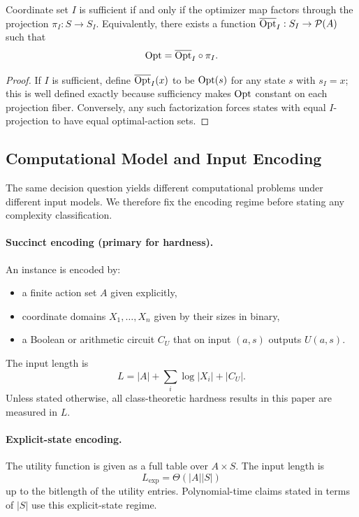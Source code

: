 \begin{proposition}\label{prop:sufficiency-char}
Coordinate set $I$ is sufficient if and only if the optimizer map factors through the projection $\pi_I : S \to S_I$. Equivalently, there exists a function $\overline{\mathrm{Opt}}_I : S_I \to \mathcal{P}(A)$ such that
\[
\mathrm{Opt} = \overline{\mathrm{Opt}}_I \circ \pi_I.
\]
\end{proposition}


\begin{proof}
If $I$ is sufficient, define $\overline{\mathrm{Opt}}_I(x)$ to be $\mathrm{Opt}(s)$ for any state $s$ with $s_I = x$; this is well defined exactly because sufficiency makes $\mathrm{Opt}$ constant on each projection fiber. Conversely, any such factorization forces states with equal $I$-projection to have equal optimal-action sets.
\end{proof}

\subsection{Computational Model and Input Encoding}\label{sec:encoding}

The same decision question yields different computational problems under different input models. We therefore fix the encoding regime before stating any complexity classification.

\paragraph{Succinct encoding (primary for hardness).}
An instance is encoded by:
\begin{itemize}
\item a finite action set $A$ given explicitly,
\item coordinate domains $X_1,\ldots,X_n$ given by their sizes in binary,
\item a Boolean or arithmetic circuit $C_U$ that on input $(a,s)$ outputs $U(a,s)$.
\end{itemize}
The input length is
\[
L = |A| + \sum_i \log |X_i| + |C_U|.
\]
Unless stated otherwise, all class-theoretic hardness results in this paper are measured in $L$.

\paragraph{Explicit-state encoding.}
The utility function is given as a full table over $A \times S$. The input length is
\[
L_{\mathrm{exp}} = \Theta(|A||S|)
\]
up to the bitlength of the utility entries. Polynomial-time claims stated in terms of $|S|$ use this explicit-state regime.

